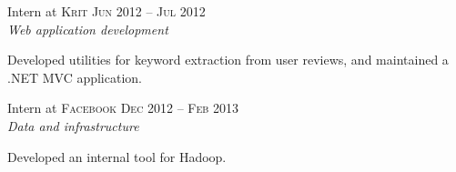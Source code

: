 \documentclass[a4paper,10pt]{article} %
\begin{document}
\begin{minipage}[t]{0.5\textwidth}
{\raggedright{\large Intern at \textsc{Krit}} \hfill \textsc{Jun 2012 -- Jul 2012}\\
\textit{Web application development}\\[5pt]}

Developed utilities for keyword extraction from user reviews, and maintained a .NET MVC application.\\


{\raggedright{\large Intern at \textsc{Facebook}} \hfill \textsc{Dec 2012 -- Feb 2013}\\
\textit{Data and infrastructure}\\[5pt]}

Developed an internal tool for Hadoop.\\


\end{minipage} %
\hfill
\end{document}
